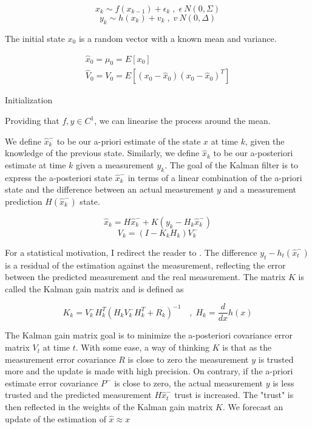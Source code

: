 \documentclass[mscthesis]{usiinfthesis}
\begin{document}
\[
x_k \sim f(x_{k-1}) + \epsilon_k \; , \; \epsilon ~ N(0, \Sigma)
\]
\[
y_k \sim h(x_{k}) + v_{k} \; , \; v ~ N(0, \Delta)
\]

The initial state $x_0$ is a random vector with a known mean and variance.

\begin{eqfloat}
\begin{equation}
\begin{array}{l}
\hat{x}_0 = \mu_0 = E[x_0] \\
\hat{V}_0 = V_0 = E[(x_0-\hat{x}_0)(x_0-\hat{x}_0)^T] 
\end{array}
\label{eq:kalman_init}
\end{equation}
\caption{Initialization}
\end{eqfloat}

Providing that $f, y \in C^1$, we can linearise the process around the mean. 

We define $\hat{x}_k^-$ to be our a-priori estimate of the state $x$ at time $k$, given the knowledge of the previous state. Similarly, we define $\hat{x}_k$ to be our a-posteriori estimate at time $k$ given a measurement $y_k$. The goal of the Kalman filter is to express the a-posteriori state $\hat{x}_k^-$ in terms of a linear combination of the a-priori state and the difference between an actual measurement $y$ and a measurement prediction $H(\hat{x}_k^-)$ state. 

\[
\hat{x}_k = H\hat{x}_k^- + K (y_k - H_k \hat{x}_k^-)
\]
\[
V_k = (I-K_k H_k)V_k^-
\]


For a statistical motivation, I redirect the reader to \citet{paper:Maybeck79}. The difference $y_t - h_t(\hat{x}_t^-)$ is a residual of the estimation against the measurement, reflecting the error between the predicted measurement and the real measurement. The matrix $K$ is called the Kalman gain matrix and is defined as 


\[
K_k = V_k^- H^T_k (H_k V_k^- H^T_k + R_k)^{-1}  \quad , \; H_k = \frac{d}{dx} h(x)
\]

The Kalman gain matrix goal is to minimize the a-posteriori covariance error matrix $V_t$ at time $t$. With some ease, a way of thinking $K$ is that as the measurement error covariance $R$ is close to zero the measurement $y$ is trusted more and the update is made with high precision. On contrary, if the a-priori estimate error covariance $P^-$ is close to zero, the actual measurement $y$ is less trusted and the predicted measurement $H\hat{x}_t^-$ trust is increased. The "trust" is then reflected in the weights of the Kalman gain matrix $K$. We forecast an update of the estimation of $\hat{x} \approx x$
\end{document}
